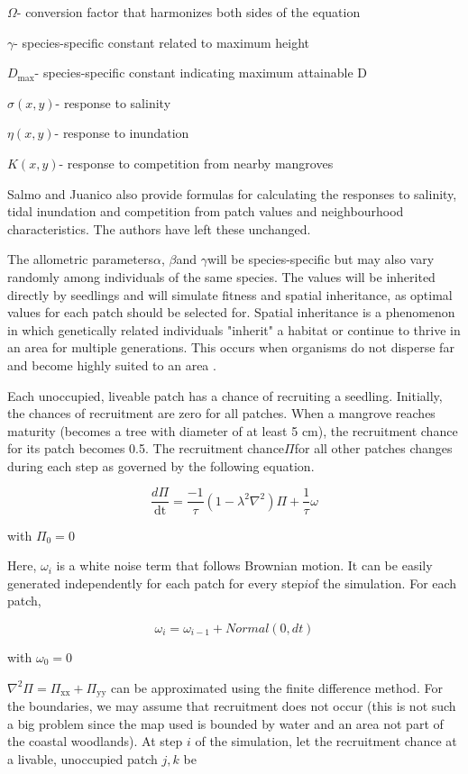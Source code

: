 \(\Omega\)- conversion factor that harmonizes both sides of the equation

\(\gamma\)- species-specific constant related to maximum height

\(D_{\max}\)- species-specific constant indicating maximum attainable D

\(\sigma(x,y)\)- response to salinity

\(\eta(x,y)\)- response to inundation

\(K(x,y)\)- response to competition from nearby mangroves

Salmo and Juanico also provide formulas for calculating the responses to
salinity, tidal inundation and competition from patch values and
neighbourhood characteristics. The authors have left these unchanged.

The allometric parameters\(\alpha\), \(\beta\)and \(\gamma\)will be
species-specific but may also vary randomly among individuals of the
same species. The values will be inherited directly by seedlings and
will simulate fitness and spatial inheritance, as optimal values for
each patch should be selected for. Spatial inheritance is a phenomenon
in which genetically related individuals "inherit" a habitat or
continue to thrive in an area for multiple generations. This occurs when
organisms do not disperse far and become highly suited to an area \cite{Schauber2007}.

Each unoccupied, liveable patch has a chance of recruiting a seedling.
Initially, the chances of recruitment are zero for all patches. When a
mangrove reaches maturity (becomes a tree with diameter of at least 5
cm), the recruitment chance for its patch becomes 0.5. The recruitment
chance\(\Pi\)for all other patches changes during each step as governed 
by the following equation.

$$\frac{d\Pi}{\text{dt}} = \frac{- 1}{\tau}(1 - \lambda^{2}\nabla^{2})\Pi + \frac{1}{\tau}\omega$$

with $\Pi_{0} = 0$

Here, $\omega_{i}$ is a white noise term that follows Brownian motion.
It can be easily generated independently for each patch for every
step\(i\)of the simulation. For each patch,

$$\omega_{i} = \omega_{i - 1} + Normal(0,dt)$$

with $\omega_{0} = 0$


$\nabla^{2}\Pi = \Pi_{\text{xx}} + \Pi_{\text{yy}}$ can be approximated
using the finite difference method. For the boundaries, we may assume
that recruitment does not occur (this is not such a big problem since
the map used is bounded by water and an area not part of the coastal
woodlands). At step \(i\) of the simulation, let the recruitment chance
at a livable, unoccupied patch \(j,k\) be

